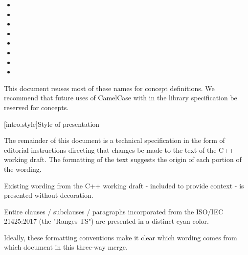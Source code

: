 \pnum
{}
\begin{itemize}
\item {}
\item {}
\item {}
\item {}
\item {}
\item {}
\item {}
\item {}
\end{itemize}
This document reuses most of these names for concept definitions. We recommend
that future uses of CamelCase with  in the library specification
be reserved for concepts.


[intro.style]{Style of presentation}

\pnum
The remainder of this document is a technical specification in the form of
editorial instructions directing that changes be made to the text of the C++
working draft. The formatting of the text suggests the origin of each portion of
the wording.

Existing wording from the C++ working draft - included to provide context - is
presented without decoration.

\begin{addedblock}
Entire clauses / subclauses / paragraphs incorporated from the ISO/IEC 21425:2017
(the "Ranges TS") are presented in a distinct cyan color.
\end{addedblock}





Ideally, these formatting conventions make it clear which wording comes from
which document in this three-way merge.
